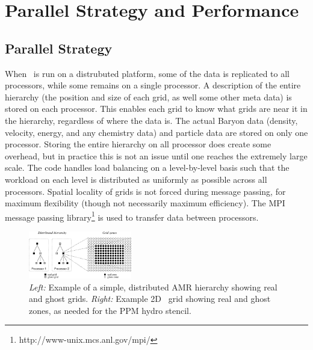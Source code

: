 \section{Parallel Strategy and Performance}
\label{sec.parallel}

\subsection{Parallel Strategy}


When \enzo\ is run on a distrubuted platform, some of the data is
replicated to all processors, while some remains on a single processor.
A description of the entire hierarchy (the position and size of each grid, as well
some other meta data) is stored on each processor.  This enables each
grid to know what grids are near it in the hierarchy, regardless of
where the data is.  The actual Baryon data (density, velocity, energy,
and any chemistry data) and particle data are stored on only one
processor.  Storing the entire hierarchy on all processor does create
some overhead, but in practice this is not an issue until one reaches
the extremely large scale.
  The code handles load balancing 
on a level-by-level basis such that the workload on each level is 
distributed as uniformly as possible across all processors.  Spatial locality of 
grids is not forced during message passing, for maximum flexibility (though not
necessarily maximum efficiency).  
The MPI message passing library\footnote{http://www-unix.mcs.anl.gov/mpi/}
 is used to transfer data between processors.
 
 





\begin{figure}
\begin{center}
\includegraphics[width=0.4\textwidth]{figures/amr_hierarchy.eps}
\end{center}
\caption{\emph{Left:}  Example of a simple, distributed AMR hierarchy showing real and ghost grids.
\emph{Right:}  Example 2D \enzo\ grid showing real and ghost zones, as 
needed for the PPM hydro stencil. }
\label{fig:amr_hierarchy}
\end{figure}



